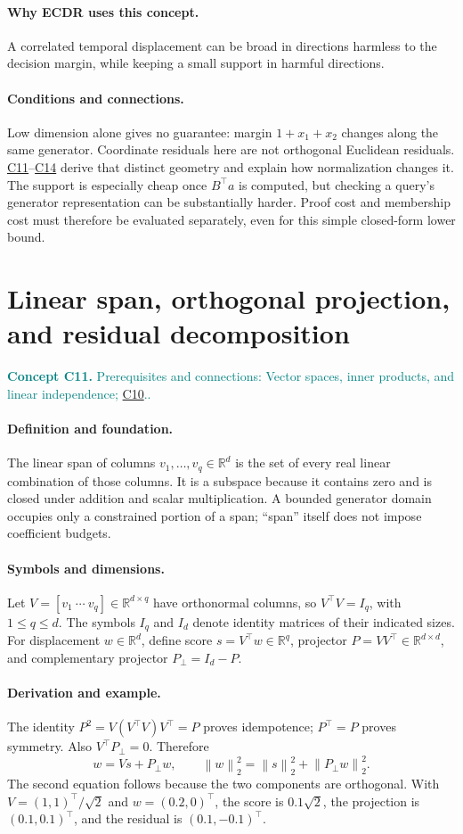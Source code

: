 \documentclass[11pt,a4paper]{article}
\newcommand{\R}{\mathbb R}
\newcommand{\norm}[1]{\left\lVert#1\right\rVert}
\newcommand{\conceptid}{Front matter}
\newcommand{\concept}[3]{\clearpage\renewcommand{\conceptid}{#1}%
\section{#2}\label{concept:#1}%
\textcolor{teal}{\textbf{Concept #1.} Prerequisites and connections: #3.}\par
\typeout{ECDR-CONCEPT-START #1 PAGE=\thepage}}
\begin{document}
\paragraph{Why ECDR uses this concept.}
A correlated temporal displacement can be broad in directions harmless to the decision margin, while keeping a small support in harmful directions.
\paragraph{Conditions and connections.}
Low dimension alone gives no guarantee: margin $1+x_1+x_2$ changes along the same generator. Coordinate residuals here are not orthogonal Euclidean residuals. \hyperref[concept:C11]{C11}--\hyperref[concept:C14]{C14} derive that distinct geometry and explain how normalization changes it. The support is especially cheap once $B^\top a$ is computed, but checking a query's generator representation can be substantially harder. Proof cost and membership cost must therefore be evaluated separately, even for this simple closed-form lower bound.
\par\label{endconcept:C10}

\concept{C11}{Linear span, orthogonal projection, and residual decomposition}{Vector spaces, inner products, and linear independence; \hyperref[concept:C10]{C10}.}
\paragraph{Definition and foundation.}
The linear span of columns $v_1,\ldots,v_q\in\R^d$ is the set of every real linear combination of those columns. It is a subspace because it contains zero and is closed under addition and scalar multiplication. A bounded generator domain occupies only a constrained portion of a span; ``span'' itself does not impose coefficient budgets.
\paragraph{Symbols and dimensions.}
Let $V=[v_1\ \cdots\ v_q]\in\R^{d\times q}$ have orthonormal columns, so $V^\top V=I_q$, with $1\le q\le d$. The symbols $I_q$ and $I_d$ denote identity matrices of their indicated sizes. For displacement $w\in\R^d$, define score $s=V^\top w\in\R^q$, projector $P=VV^\top\in\R^{d\times d}$, and complementary projector $P_\perp=I_d-P$.
\paragraph{Derivation and example.}
The identity $P^2=V(V^\top V)V^\top=P$ proves idempotence; $P^\top=P$ proves symmetry. Also $V^\top P_\perp=0$. Therefore
\[
 w=Vs+P_\perp w,\qquad
 \norm{w}_2^2=\norm{s}_2^2+\norm{P_\perp w}_2^2.
\]
The second equation follows because the two components are orthogonal. With $V=(1,1)^\top/\sqrt2$ and $w=(0.2,0)^\top$, the score is $0.1\sqrt2$, the projection is $(0.1,0.1)^\top$, and the residual is $(0.1,-0.1)^\top$.
\end{document}
